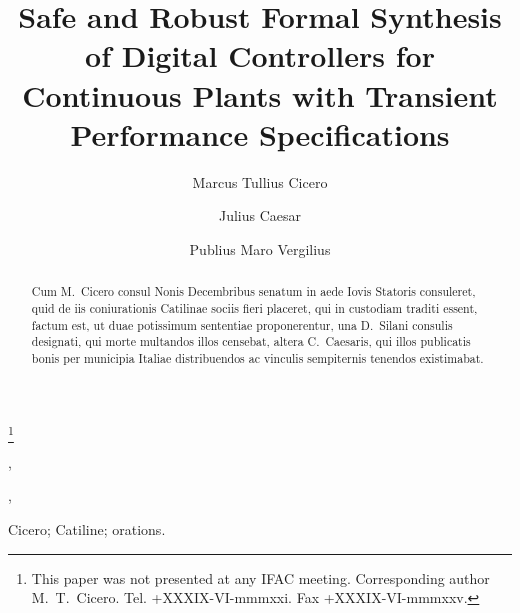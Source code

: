 \documentclass[twocolumn]{autart}    %
\begin{document}
\begin{frontmatter}


\title{Safe and Robust Formal  Synthesis of Digital Controllers for Continuous Plants with Transient Performance Specifications} %

\thanks[footnoteinfo]{This paper was not presented at any IFAC 
meeting. Corresponding author M.~T.~Cicero. Tel. +XXXIX-VI-mmmxxi. 
Fax +XXXIX-VI-mmmxxv.}

\author[Paestum]{Marcus Tullius Cicero},    %
\author[Rome]{Julius Caesar},               %
\author[Baiae]{Publius Maro Vergilius}  %

\address[Paestum]{Buckingham Palace, Paestum}  %
\address[Rome]{Senate House, Rome}             %
\address[Baiae]{The White House, Baiae}        %

          
\begin{keyword}                           %
Cicero; Catiline; orations.               %
\end{keyword}                             %


\begin{abstract}                          %
Cum M.~Cicero consul Nonis Decembribus senatum in aede Iovis 
Statoris consuleret, quid de iis coniurationis Catilinae sociis 
fieri placeret, qui in custodiam traditi essent, factum est, ut 
duae potissimum sententiae proponerentur, una D.~Silani consulis 
designati, qui morte multandos illos censebat, altera C.~Caesaris, 
qui illos publicatis bonis per municipia Italiae distribuendos 
ac vinculis sempiternis tenendos existimabat.
\end{abstract}

\end{frontmatter}
\end{document}
